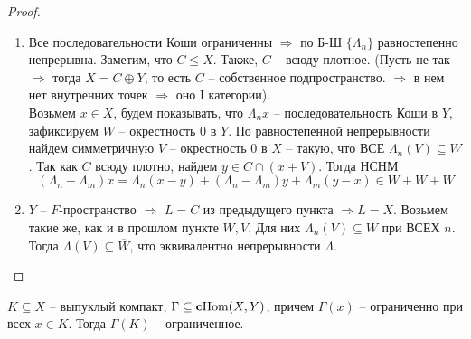 \documentclass[12pt, a4paper, oneside]{book}
\begin{document}
\begin{proof}\ \\
\begin{enumerate}
    \item Все последовательности Коши ограниченны $\Rightarrow $ по Б-Ш $\{\Lambda_n\}$ равностепенно непрерывна.
    Заметим, что $C \leqslant X$. Также, $C$ -- всюду плотное. \big({\small Пусть не так $\Rightarrow$ тогда $X = \overline{C} \oplus Y$, то есть $\overline{C}$ -- собственное подпространство.
    $\Rightarrow$ в нем нет внутренних точек $\Rightarrow$ оно I категории}\big).
    \ \\ Возьмем $x \in X$, будем показывать, что $\Lambda_n x$ -- последовательность Коши в $Y$, зафиксируем $W$ -- окрестность 0 в $Y$.
    По равностепенной непрерывности найдем симметричную $V$ -- окрестность 0 в $X$ -- такую, что ВСЕ $\Lambda_n(V) \subseteq W$.
    Так как $C$ всюду плотно, найдем $y \in C \cap \left(x+V \right)$. Тогда НСНМ
    $$(\Lambda_n - \Lambda_m)x = \Lambda_n(x-y) + (\Lambda_n - \Lambda_m)y + \Lambda_m(y-x) \in W + W + W$$
    \item $Y$ -- $F$-пространство $\Rightarrow$ $L = C$ из предыдущего пункта $\Rightarrow L = X$. Возьмем такие же, как и в прошлом пункте $W,V$. Для них $\Lambda_n(V) \subseteq W$ при ВСЕХ $n$. Тогда $\Lambda(V) \subseteq \overline{W}$, что эквивалентно непрерывности $\Lambda$.
\end{enumerate}
\end{proof}

\begin{theorem}
    $K \subseteq X$ -- выпуклый компакт, $\Gamma \subseteq \text{\textbf{c}Hom}(X, Y)$, причем $\Gamma(x)$ -- ограниченно при всех $x \in K$. Тогда $\Gamma(K)$ -- ограниченное.
\end{theorem}
\end{document}
